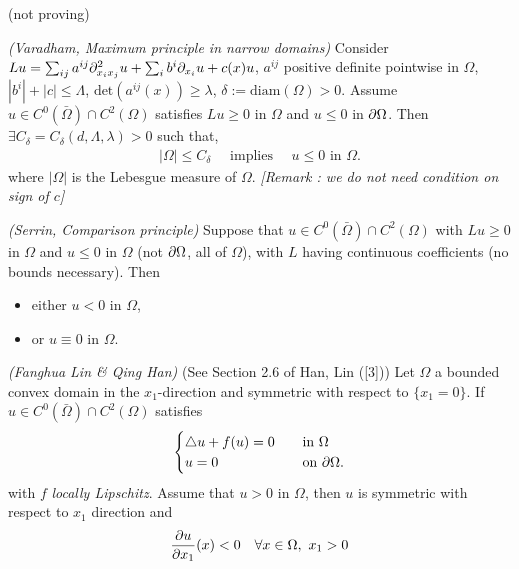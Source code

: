 \documentclass[10pt,a4paper]{article}
\renewenvironment{i}
{\begin{itemize} 
	}%
	{\end{itemize}
}
\begin{document}
(not proving)
\s

\thm \emph{(Varadham, Maximum principle in narrow domains)} Consider $Lu = \sum_{ij}a^{ij} \partial^2_{x_i x_j} u + \sum_i b^i \partial_{x_i} u + c(x) u$, $a^{ij}$ positive definite pointwise in $\Omega$, $|b^i| + |c| \leq \Lambda$, $\text{det}(a^{ij}(x)) \geq \lambda$, $\delta := \text{diam}(\Omega)>0$. Assume $u \in C^0(\bar{\Omega}) \cap C^2(\Omega)$ satisfies $Lu \geq 0$ in $\Omega$ and $u\leq 0$ in $\partial \Omega$. Then $\exists C_{\delta} = C_{\delta}(d, \Lambda, \lambda) >0$ such that,
\begin{align*}
|\Omega|\leq C_{\delta} \quad \text{ implies } \quad u\leq 0\,\, \text{in } \Omega.
\end{align*}
where $|\Omega|$ is the Lebesgue measure of $\Omega$.
\emph{[Remark : we do not need condition on sign of $c$]}
\s

\thm \emph{(Serrin, Comparison principle)} Suppose that $u\in C^0(\bar{\Omega}) \cap C^2(\Omega)$ with $Lu \geq 0$ in $\Omega$ and $u\leq 0$ in $\Omega$ (not $\partial \Omega$, all of $\Omega$), with $L$ having continuous coefficients (no bounds necessary). Then
\begin{i}
\item either $u< 0$ in $\Omega$,
\item or $u\equiv 0$ in $\Omega$.
\end{i}
\s

\lem \emph{(Fanghua Lin \& Qing Han)} (See Section 2.6 of Han, Lin ([3])) Let $\Omega$ a bounded convex domain in the $x_1$-direction and symmetric with respect to $\{x_1 =0 \}$. If $u\in C^0(\bar{\Omega}) \cap C^2(\Omega)$ satisfies 
\begin{align*}
\begin{cases}
\triangle u + f(u) =0 \quad &\text{in } \Omega \\
u =0 \quad &\text{on } \partial \Omega.
\end{cases}
\end{align*}
with $f$ \emph{locally Lipschitz}. Assume that $u>0$ in $\Omega$, then $u$ is symmetric with respect to $x_1$ direction and
\begin{align*}
\frac{\partial u}{\partial x_1}(x) < 0 \quad \forall x\in \Omega, \,\, x_1>0
\end{align*}
\s

\newday
\end{document}
